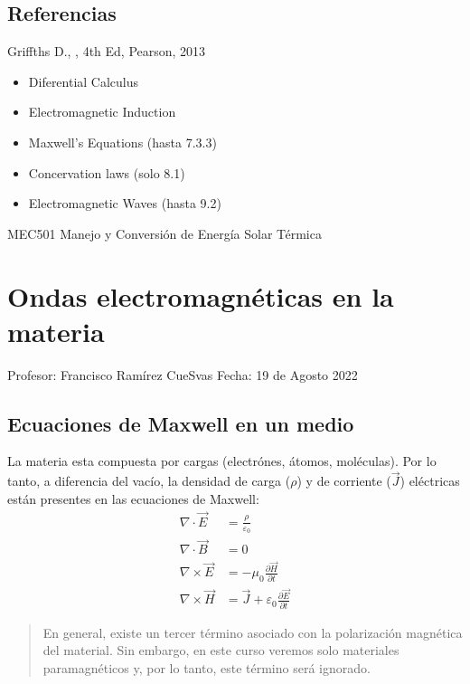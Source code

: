 \documentclass[letterpaper,10pt,english]{jupyterBook}
\begin{document}
\section{Referencias}
\label{\detokenize{1_ondas_electromagneticas/1_ondas_electromagneticas:referencias}}
\sphinxAtStartPar
Griffths D., , 4th Ed, Pearson, 2013
\begin{itemize}
\item {} 
 Diferential Calculus

\item {} 
 Electromagnetic Induction

\item {} 
 Maxwell’s Equations (hasta  7.3.3)

\item {} 
 Concervation laws (solo 8.1)

\item {} 
 Electromagnetic Waves (hasta 9.2)

\end{itemize}

\sphinxstepscope

\sphinxAtStartPar
MEC501 \sphinxhyphen{} Manejo y Conversión de Energía Solar Térmica


\chapter{Ondas electromagnéticas en la materia}
\label{\detokenize{2_ondas_EM_en_la_materia/2_ondas_EM_en_la_materia:ondas-electromagneticas-en-la-materia}}\label{\detokenize{2_ondas_EM_en_la_materia/2_ondas_EM_en_la_materia::doc}}
\sphinxAtStartPar

Profesor: Francisco Ramírez CueSvas
Fecha: 19 de Agosto 2022


\section{Ecuaciones de Maxwell en un medio}
\label{\detokenize{2_ondas_EM_en_la_materia/2_ondas_EM_en_la_materia:ecuaciones-de-maxwell-en-un-medio}}
\sphinxAtStartPar
La materia esta compuesta por cargas (electrónes, átomos, moléculas). Por lo tanto, a diferencia del vacío, la densidad de carga (\(\rho\)) y de corriente (\(\vec{J}\)) eléctricas están presentes en las ecuaciones de Maxwell:
\begin{align*}
\nabla\cdot\vec{E} &= \frac{\rho}{\varepsilon_0} \\
\nabla\cdot\vec{B} &= 0 \\
\nabla\times\vec{E} &= -\mu_0\frac{\partial \vec{H}}{\partial t} \\
\nabla\times\vec{H} &= \vec{J} + \varepsilon_0\frac{\partial \vec{E}}{\partial t}
\end{align*}\begin{quote}

\sphinxAtStartPar
En general, existe un tercer término asociado con la polarización magnética del material. Sin embargo, en este curso veremos solo materiales paramagnéticos y, por lo tanto, este término será ignorado.
\end{quote}
\end{document}
